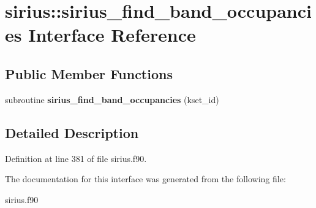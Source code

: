 \hypertarget{interfacesirius_1_1sirius__find__band__occupancies}{}\section{sirius\+:\+:sirius\+\_\+find\+\_\+band\+\_\+occupancies Interface Reference}
\label{interfacesirius_1_1sirius__find__band__occupancies}
\subsection*{Public Member Functions}
\begin{DoxyCompactItemize}
\item 
\hypertarget{interfacesirius_1_1sirius__find__band__occupancies_a6607d5342613578c229d09c3e67eeddd}{}subroutine {\bfseries sirius\+\_\+find\+\_\+band\+\_\+occupancies} (kset\+\_\+id)\label{interfacesirius_1_1sirius__find__band__occupancies_a6607d5342613578c229d09c3e67eeddd}

\end{DoxyCompactItemize}


\subsection{Detailed Description}


Definition at line 381 of file sirius.\+f90.



The documentation for this interface was generated from the following file\+:\begin{DoxyCompactItemize}
\item 
sirius.\+f90\end{DoxyCompactItemize}
